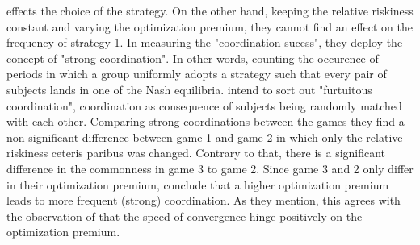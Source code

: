 \documentclass[11pt]{article}
\begin{document}
effects the choice of the strategy. 
On the other hand, keeping the relative riskiness constant and varying the
optimization premium, they cannot find an effect on the frequency of 
strategy 1. 
In measuring the "coordination sucess", they deploy the concept of "strong
coordination". 
In other words, counting the occurence of periods in which a group
uniformly adopts a strategy such that every pair of subjects lands in one
of the Nash equilibria. \textcite{dubois_optimization_2012} intend to sort 
out "furtuitous coordination", coordination as consequence of subjects being
randomly matched with each other. Comparing strong coordinations between the
games they find a non-significant difference between game 1 and game 2 in 
which only the relative riskiness ceteris paribus was changed. Contrary to 
that, there is a significant difference in the commonness in game 3 to game 2.
Since game 3 and 2 only differ in their optimization premium, 
\textcite{dubois_optimization_2012} conclude that a higher optimization
premium leads to more frequent (strong) coordination. 
As they mention, this agrees with the observation of 
\textcite{battalio_optimization_2001} that the speed of convergence hinge 
positively on the optimization premium. 
\end{document}
